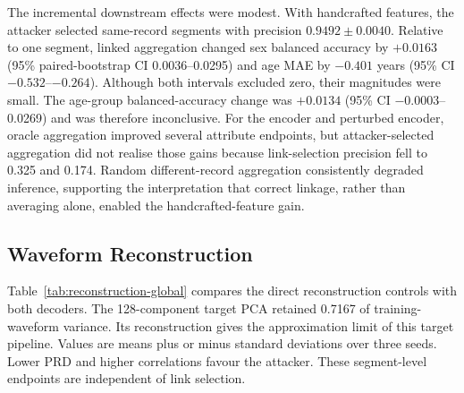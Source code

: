 \documentclass[journal]{IEEEtran}
\begin{document}
The incremental downstream effects were modest. With handcrafted features, the
attacker selected same-record segments with precision
$0.9492\mathbin{\pm}0.0040$. Relative to one segment, linked aggregation
changed sex balanced accuracy by $+0.0163$
(95\% paired-bootstrap CI 0.0036--0.0295) and age MAE by $-0.401$ years
(95\% CI $-0.532$--$-0.264$). Although both intervals excluded zero, their
magnitudes were small. The age-group balanced-accuracy change was $+0.0134$
(95\% CI $-0.0003$--0.0269) and was therefore inconclusive.
For the encoder and perturbed encoder, oracle aggregation improved several
attribute endpoints, but attacker-selected aggregation did not realise those
gains because link-selection precision fell to 0.325 and 0.174. Random
different-record aggregation consistently degraded inference, supporting the
interpretation that correct linkage, rather than averaging alone, enabled the
handcrafted-feature gain.

\subsection{Waveform Reconstruction}
\label{subsec:results-reconstruction}

Table~\ref{tab:reconstruction-global} compares the direct reconstruction
controls with both decoders. The 128-component target PCA retained 0.7167 of
training-waveform variance. Its reconstruction gives the approximation limit
of this target pipeline. Values are means plus or minus standard deviations
over three seeds. Lower PRD and higher correlations favour the attacker. These
segment-level endpoints are independent of link selection.
\end{document}

